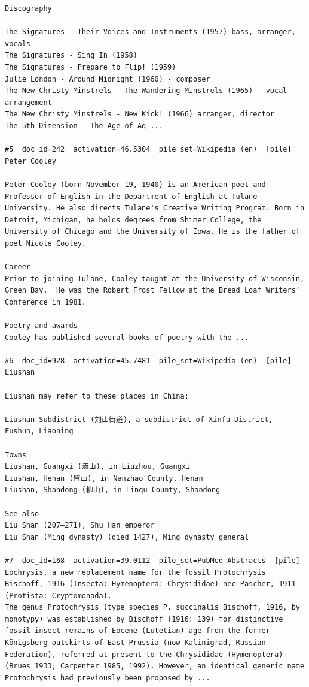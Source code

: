 \begin{verbatim}
Discography

The Signatures - Their Voices and Instruments (1957) bass, arranger, vocals
The Signatures - Sing In (1958)
The Signatures - Prepare to Flip! (1959)
Julie London - Around Midnight (1960) - composer
The New Christy Minstrels - The Wandering Minstrels (1965) - vocal arrangement
The New Christy Minstrels - New Kick! (1966) arranger, director
The 5th Dimension - The Age of Aq ...

#5  doc_id=242  activation=46.5304  pile_set=Wikipedia (en)  [pile]
Peter Cooley

Peter Cooley (born November 19, 1940) is an American poet and Professor of English in the Department of English at Tulane University. He also directs Tulane's Creative Writing Program. Born in Detroit, Michigan, he holds degrees from Shimer College, the University of Chicago and the University of Iowa. He is the father of poet Nicole Cooley.

Career
Prior to joining Tulane, Cooley taught at the University of Wisconsin, Green Bay.  He was the Robert Frost Fellow at the Bread Loaf Writers’ Conference in 1981.

Poetry and awards
Cooley has published several books of poetry with the ...

#6  doc_id=928  activation=45.7481  pile_set=Wikipedia (en)  [pile]
Liushan

Liushan may refer to these places in China:

Liushan Subdistrict (刘山街道), a subdistrict of Xinfu District, Fushun, Liaoning

Towns
Liushan, Guangxi (流山), in Liuzhou, Guangxi
Liushan, Henan (留山), in Nanzhao County, Henan
Liushan, Shandong (柳山), in Linqu County, Shandong

See also
Liu Shan (207–271), Shu Han emperor
Liu Shan (Ming dynasty) (died 1427), Ming dynasty general

#7  doc_id=168  activation=39.0112  pile_set=PubMed Abstracts  [pile]
Eochrysis, a new replacement name for the fossil Protochrysis Bischoff, 1916 (Insecta: Hymenoptera: Chrysididae) nec Pascher, 1911 (Protista: Cryptomonada).
The genus Protochrysis (type species P. succinalis Bischoff, 1916, by monotypy) was established by Bischoff (1916: 139) for distinctive fossil insect remains of Eocene (Lutetian) age from the former Königsberg outskirts of East Prussia (now Kalinigrad, Russian Federation), referred at present to the Chrysididae (Hymenoptera) (Brues 1933; Carpenter 1985, 1992). However, an identical generic name Protochrysis had previously been proposed by ...


\end{verbatim}
